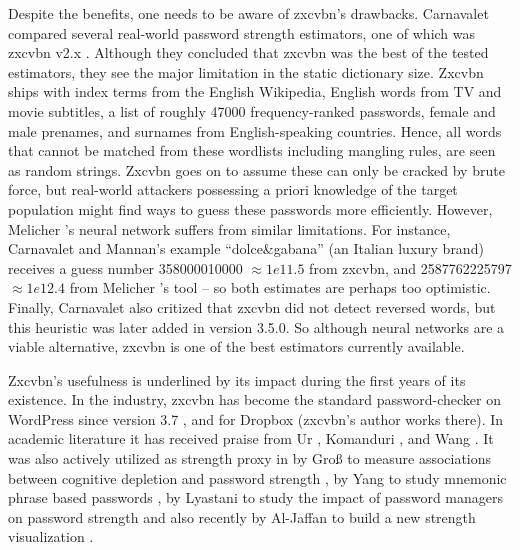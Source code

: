 	Despite the benefits, one needs to be aware of zxcvbn's drawbacks. Carnavalet compared several real-world password strength estimators, one of which was zxcvbn v2.x \cite{DeCarnedeCarnavalet2015PasswordMeters}. Although they concluded that zxcvbn was the best of the tested estimators, they see the major limitation in the static dictionary size. Zxcvbn ships with index terms from the English Wikipedia, English words from TV and movie subtitles, a list of roughly 47000 frequency-ranked passwords, female and male prenames, and surnames from English-speaking countries. Hence, all words that cannot be matched from these wordlists including mangling rules, are seen as random strings. Zxcvbn goes on to assume these can only be cracked by brute force, but real-world attackers possessing a priori knowledge of the target population might find ways to guess these passwords more efficiently. However, Melicher \etal's neural network suffers from similar limitations. For instance, Carnavalet and Mannan's \cite{Carnavalet2014AnalyzingPWStrengthMeters} example ``dolce\&gabana'' (an Italian luxury brand) receives a guess number 358000010000 $\approx 1e11.5$ from zxcvbn, and 2587762225797 $\approx 1e12.4$ from Melicher \etal's tool -- so both estimates are perhaps too optimistic. Finally, Carnavalet also critized that zxcvbn did not detect reversed words, but this heuristic was later added in version 3.5.0. So although neural networks are a viable alternative, zxcvbn is one of the best estimators currently available. 
	
	Zxcvbn's usefulness is underlined by its impact during the first years of its existence. In the industry, zxcvbn has become the standard password-checker on WordPress since version 3.7 \cite{DeCarnedeCarnavalet2015PasswordMeters}, and for Dropbox (zxcvbn's author works there). In academic literature it has received praise from Ur \etal \cite{Ur2017DataDrivenPWMeter}, Komanduri \etal \cite{Komanduri2014Telepathwords}, and Wang \etal \cite{Wang2016fuzzyPWM}. It was also actively utilized as strength proxy in by Groß \etal to measure associations between cognitive depletion and password strength \cite{Gross2016CognitiveDepletion}, by Yang \etal to study mnemonic phrase based passwords \cite{Yang2016MnemonicSentenceBased}, by Lyastani \etal to study the impact of password managers on password strength \cite{Lyastani2017ImpactPWMPasswordStrength} and also recently by Al-Jaffan to build a new strength visualization \cite{Aljaffan2017PasswordSecurityVisualizer}.
	
